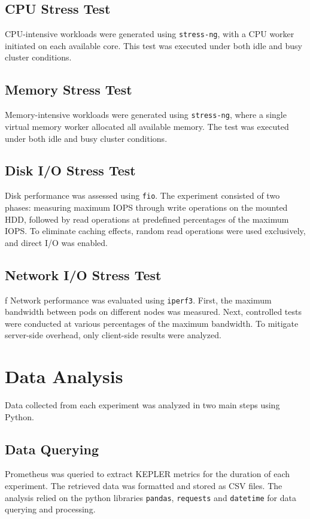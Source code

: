\subsection{CPU Stress Test}
CPU-intensive workloads were generated using \texttt{stress-ng}, with a CPU worker initiated on each available core. This test was executed under both idle and busy cluster conditions.

\subsection{Memory Stress Test}
Memory-intensive workloads were generated using \texttt{stress-ng}, where a single virtual memory worker allocated all available memory. The test was executed under both idle and busy cluster conditions.

\subsection{Disk I/O Stress Test}
Disk performance was assessed using \texttt{fio}. The experiment consisted of two phases: measuring maximum IOPS through write operations on the mounted HDD, followed by read operations at predefined percentages of the maximum IOPS. To eliminate caching effects, random read operations were used exclusively, and direct I/O was enabled.

\subsection{Network I/O Stress Test}f
Network performance was evaluated using \texttt{iperf3}. First, the maximum bandwidth between pods on different nodes was measured. Next, controlled tests were conducted at various percentages of the maximum bandwidth. To mitigate server-side overhead, only client-side results were analyzed.

\section{Data Analysis}
Data collected from each experiment was analyzed in two main steps using Python.

\subsection{Data Querying}
Prometheus was queried to extract KEPLER metrics for the duration of each experiment. The retrieved data was formatted and stored as CSV files. The analysis relied on the python libraries \texttt{pandas}, \texttt{requests} and \texttt{datetime} for data querying and processing.

